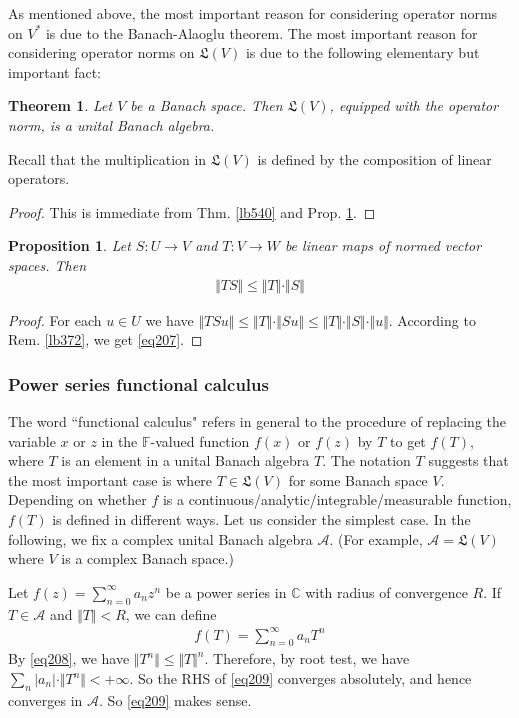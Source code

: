 \documentclass[12pt,b5paper,notitlepage]{article}
\theoremstyle{definition}
\theoremstyle{plain}
\newtheorem{thm}[df]{Theorem}
\newtheorem{pp}[df]{Proposition}
\newcommand{\fk}{\mathfrak}
\newcommand{\scr}{\mathscr}
\newcommand{\Cbb}{\mathbb C}
\newcommand{\Fbb}{\mathbb F}
\numberwithin{equation}{section}
\begin{document}
As mentioned above, the most important reason for considering operator norms on $V^*$ is due to the Banach-Alaoglu theorem. The most important reason for considering operator norms on $\fk L(V)$ is due to the following elementary but important fact:


\begin{thm}
Let $V$ be a Banach space. Then $\fk L(V)$, equipped with the operator norm, is a unital Banach algebra.
\end{thm}

Recall that the multiplication in $\fk L(V)$ is defined by the composition of linear operators.

\begin{proof}
This is immediate from Thm. \ref{lb540} and Prop. \ref{lb541}.
\end{proof}

\begin{pp}\label{lb541}
Let $S:U\rightarrow V$ and $T:V\rightarrow W$ be linear maps of normed vector spaces. Then
\begin{align}
\Vert TS\Vert\leq\Vert T\Vert \cdot\Vert S\Vert  \label{eq207}
\end{align}
\end{pp}


\begin{proof}
For each $u\in U$ we have $\Vert TSu\Vert\leq \Vert T\Vert\cdot \Vert Su\Vert\leq \Vert T\Vert\cdot\Vert S\Vert\cdot\Vert u\Vert$. According to Rem. \ref{lb372}, we get \eqref{eq207}.
\end{proof}


\subsubsection{Power series functional calculus}



The word ``functional calculus" refers in general to the procedure of replacing the variable $x$ or $z$ in the $\Fbb$-valued function $f(x)$ or $f(z)$ by $T$ to get $f(T)$, where $T$ is an element in a unital Banach algebra $T$. The notation $T$ suggests that the most important case is where $T\in\fk L(V)$ for some Banach space $V$. Depending on whether $f$ is a continuous/analytic/integrable/measurable function, $f(T)$ is defined in different ways. Let us consider the simplest case. In the following, we fix a complex unital Banach algebra $\scr A$. (For example, $\scr A=\fk L(V)$ where $V$ is a complex Banach space.)


Let $f(z)=\sum_{n=0}^\infty a_nz^n$ be a power series in $\Cbb$ with radius of convergence $R$. If $T\in\scr A$ and $\Vert T\Vert < R$, we can define
\begin{align}
f(T)=\sum_{n=0}^\infty a_nT^n  \label{eq209}
\end{align}
By \eqref{eq208}, we have $\Vert T^n\Vert\leq \Vert T\Vert^n$. Therefore, by root test, we have $\sum_n |a_n|\cdot \Vert T^n\Vert<+\infty$. So the RHS of \eqref{eq209} converges absolutely, and hence converges in $\scr A$. So \eqref{eq209} makes sense. 
\end{document}
